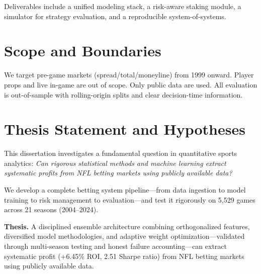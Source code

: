 \noindent Deliverables include a unified modeling stack, a risk-aware staking module, a simulator for strategy evaluation, and a reproducible system-of-systems.


\section{Scope and Boundaries}
We target pre-game markets (spread/total/moneyline) from 1999 onward. Player props and live in-game are out of scope. Only public data are used. All evaluation is out-of-sample with rolling-origin splits and clear decision-time information.

\section{Thesis Statement and Hypotheses}

This dissertation investigates a fundamental question in quantitative sports analytics: \textit{Can rigorous statistical methods and machine learning extract systematic profits from NFL betting markets using publicly available data?}

We develop a complete betting system pipeline—from data ingestion to model training to risk management to evaluation—and test it rigorously on 5,529 games across 21 seasons (2004--2024).

\textbf{Thesis.} A disciplined ensemble architecture combining orthogonalized features, diversified model methodologies, and adaptive weight optimization—validated through multi-season testing and honest failure accounting—can extract systematic profit (+6.45\% ROI, 2.51 Sharpe ratio) from NFL betting markets using publicly available data.

